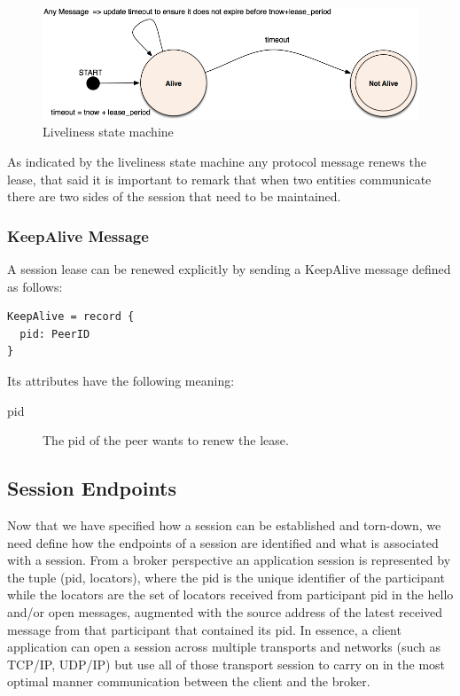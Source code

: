 \documentclass[a4paper,oneside,article]{memoir}
\begin{document}
\begin{figure}
\centering
\includegraphics[scale=0.3]{lease-expiration.png}
\caption{Liveliness state machine}\label{fig:lease-expiration}
\end{figure}

As indicated by the liveliness state machine any protocol message renews the lease, that said it is
important to remark that when two entities communicate there are two sides of the session that need
to be maintained.

\subsubsection{KeepAlive Message}
A session lease can be renewed explicitly by sending a KeepAlive message defined as follows:
\begin{verbatim}
KeepAlive = record {
  pid: PeerID
}  
\end{verbatim}
Its attributes have the following meaning:
\begin{description}
\item[pid] The pid of the peer wants to renew the lease.
\end{description}


\subsection{Session Endpoints}

Now that we have specified how a session can be established and torn-down, we need define how the
endpoints of a session are identified and what is associated with a session.  From a broker
perspective an application session is represented by the tuple (pid, locators), where the pid is the
unique identifier of the participant while the locators are the set of locators received from
participant pid in the hello and/or open messages, augmented with the source address of the latest
received message from that participant that contained its pid.  In essence, a client application can
open a session across multiple transports and networks (such as TCP/IP, UDP/IP) but use all of those
transport session to carry on in the most optimal manner communication between the client and the
broker.
\end{document}
